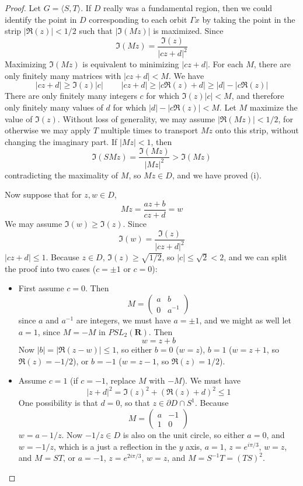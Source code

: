 \begin{proof}
    Let $G = \langle S,T \rangle$. If $D$ really was a fundamental region, then we could identify the point in $D$ corresponding to each orbit $\Gamma x$ by taking the point in the strip $|\Re(z)| < 1/2$ such that $|\Im(Mz)|$ is maximized. Since
    \[ \Im(Mz) = \frac{\Im(z)}{|cz+d|^2} \]
    Maximizing $\Im(Mz)$ is equivalent to minimizing $|cz + d|$. For each $M$, there are only finitely many matrices with $|cz + d| < M$. We have
    \[ |cz + d| \geq \Im(z) |c|\ \ \ \ \ \ \ \ \ \ |cz + d| \geq |c \Re(z) + d| \geq |d| - |c \Re(z)| \]
    There are only finitely many integers $c$ for which $\Im(z) |c| < M$, and therefore only finitely many values of $d$ for which $|d| - |c \Re(z)| < M$. Let $M$ maximize the value of $\Im(z)$. Without loss of generality, we may assume $|\Re(Mz)| < 1/2$, for otherwise we may apply $T$ multiple times to transport $Mz$ onto this strip, without changing the imaginary part. If $|Mz| < 1$, then
    \[ \Im(SMz) = \frac{\Im(Mz)}{|Mz|^2} > \Im(Mz) \]
    contradicting the maximality of $M$, so $Mz \in D$, and we have proved (i).

    Now suppose that for $z,w \in D$,
    \[ Mz = \frac{az + b}{cz + d} = w \]
    We may assume $\Im(w) \geq \Im(z)$. Since
    \[ \Im(w) = \frac{\Im(z)}{|cz + d|^2} \]
    $|cz + d| \leq 1$. Because $z \in D$, $\Im(z) \geq \sqrt{1/2}$, so $|c| \leq \sqrt{2} < 2$, and we can split the proof into two cases ($c = \pm 1$ or $c = 0$):

    \begin{itemize}
        \item First assume $c = 0$. Then
        \[ M = \begin{pmatrix} a & b \\ 0 & a^{-1} \end{pmatrix} \]
        since $a$ and $a^{-1}$ are integers, we must have $a = \pm 1$, and we might as well let $a = 1$, since $M = - M$ in $PSL_2(\mathbf{R})$. Then
        \[ w = z + b \]
        Now $|b| = |\Re(z-w)| \leq 1$, so either $b = 0$ ($w = z$), $b = 1$ ($w = z+1$, so $\Re(z) = -1/2$), or $b = -1$ ($w = z - 1$, so $\Re(z) = 1/2$).

        \item Assume $c = 1$ (if $c = -1$, replace $M$ with $-M$). We must have
        \[ |z + d|^2 = \Im(z)^2 + (\Re(z) + d)^2 \leq 1 \]
        One possibility is that $d = 0$, so that $z \in \partial D \cap S^1$. Because
        \[ M = \begin{pmatrix} a & -1 \\ 1 & 0 \end{pmatrix} \]
        $w = a - 1/z$. Now $-1/z \in D$ is also on the unit circle, so either $a = 0$, and $w = -1/z$, which is a just a reflection in the $y$ axis, $a = 1$, $z = e^{i\pi/3}$, $w = z$, and $M = ST$, or $a = -1$, $z = e^{2i\pi/3}$, $w = z$, and $M = S^{-1}T = (TS)^2$.


\end{itemize}
\end{proof}
